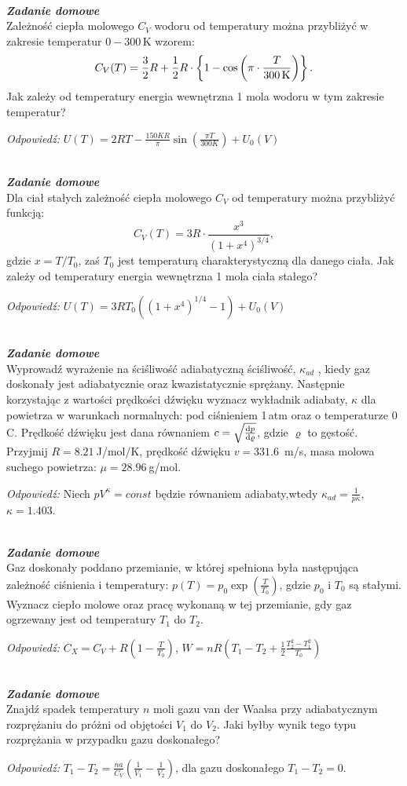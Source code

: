 \documentclass[11pt,a4paper]{article}
\newcounter{zaddom}\newcommand{\zaddom}[1][]{\addtocounter{zaddom}{1} ~\\  {\bf \emph{Zadanie domowe \arabic{zaddom} #1 }} \\}
\begin{document}
\zaddom
Zależność ciepła molowego $C_V$ wodoru od temperatury można przybliżyć w zakresie temperatur $0-300\,$K wzorem:
\[C_V(T) = \frac{3}{2}R + \frac{1}{2}R\cdot\left\{ 1 - \cos\left(\pi\cdot\frac{T}{300\,{\rm K}}\right)\right\}.\]
Jak zależy od temperatury energia wewnętrzna 1 mola wodoru w tym zakresie temperatur?

{\it Odpowiedź:} $U(T) = 2 RT - \frac{150 K R}{\pi} \sin\left(\frac{\pi T}{300K}\right) + U_{0}(V)$

\zaddom
Dla ciał stałych zależność ciepła molowego $C_V$ od temperatury można przybliżyć funkcją:
\[ C_V(T) = 3 R \cdot\frac{x^3}{(1+x^4)^{3/4}},\]
gdzie $x=T/T_0$, zaś $T_0$ jest temperaturą charakterystyczną dla danego ciała.
Jak zależy od temperatury energia wewnętrzna 1 mola ciała stałego?

{\it Odpowiedź:} $U(T) = 3R T_0 \left(\left(1+x^4\right)^{1/4}-1\right) + U_{0}(V)$

\zaddom
Wyprowadź wyrażenie na ściśliwość adiabatyczną ściśliwość, $\kappa_{ad}$ ,
kiedy gaz doskonały jest adiabatycznie oraz kwazistatycznie sprężany.
Następnie korzystając z wartości prędkości dźwięku wyznacz wykładnik adiabaty, 
$\kappa$ dla powietrza w warunkach normalnych:
pod ciśnieniem 1\,atm oraz o temperaturze 0\degree\,C.
Prędkość dźwięku jest dana równaniem $c=\sqrt{\dv{p}{\varrho}}$, gdzie $\varrho$ to gęstość.
Przyjmij $R = 8.21~$J/mol/K, prędkość dźwięku $v= 331.6$~m/s,
masa molowa suchego powietrza: $\mu = 28.96~$g/mol.

{\it Odpowiedź:} Niech $pV^\kappa=const$ będzie równaniem adiabaty,wtedy
$\kappa_{ad} = \frac{1}{p \kappa}$, $\kappa = 1.403$.

\zaddom
Gaz doskonały poddano przemianie,
w której spełniona była następująca zależność ciśnienia i temperatury:
\mbox{$p(T)=p_0 \exp(\frac{T}{T_0})$}, gdzie $p_0$ i $T_0$ są stałymi.
Wyznacz ciepło molowe oraz pracę wykonaną w tej przemianie, gdy gaz ogrzewany jest
od temperatury $T_1$ do $T_2$.

{\it Odpowiedź:}  $C_X = C_V + R\left(1 - \frac{T}{T_0}\right)$, $W = nR(T_1 - T_2 + \frac{1}{2}\frac{T_{2}^{2} - T_{1}^{2}}{T_{0}})$


\zaddom
Znajdź spadek temperatury $n$ moli gazu van der Waalsa przy adiabatycznym rozprężaniu do próżni od objętości $V_1$ do $V_2$.
Jaki byłby wynik tego typu rozprężania w przypadku gazu doskonałego?

{\it Odpowiedź:}
$T_1-T_2 = \frac{n a}{C_V} \left(\frac{1}{V_1}-\frac{1}{V_2}\right)$, 
dla gazu doskonałego $T_1-T_2 = 0$.
\end{document}

